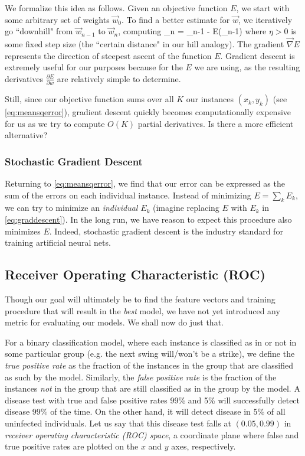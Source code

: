 \documentclass[10pt]{article}
\begin{document}
We formalize this idea as follows.
Given an objective function $E$, we start with some arbitrary set of weights $\vec{w}_0$.
To find a better estimate for $\vec{w}$, we iteratively go ``downhill" from $\vec{w}_{n-1}$ to $\vec{w}_{n}$, computing
\beq
\label{eq:graddescent}
_n = _{n-1} - \eta\vec{\nabla} E(_{n-1})
\eeq
where $\eta > 0$ is some fixed step size (the ``certain distance" in our hill analogy).
The gradient $\vec{\nabla} E$ represents the direction of steepest ascent of the function $E$.
Gradient descent is extremely useful for our purposes because for the $E$ we are using, as the resulting derivatives $\frac{\partial E}{\partial w}$ are relatively simple to determine.

Still, since our objective function sums over all $K$ our instances $(x_k, y_k)$ (see \cref{eq:meansqerror}), gradient descent quickly becomes computationally expensive for us as we try to compute $O(K)$ partial derivatives.
Is there a more efficient alternative?

\subsubsection{Stochastic Gradient Descent}

Returning to \cref{eq:meansqerror}, we find that our error can be expressed as the sum of the errors on each individual instance.
Instead of minimizing $E = \sum_k E_k$, we can try to minimize an \emph{individual} $E_k$ (imagine replacing $E$ with $E_k$ in \cref{eq:graddescent}).
In the long run, we have reason to expect this procedure also minimizes $E$.
Indeed, stochastic gradient descent is the industry standard for training artificial neural nets.

\subsection{Receiver Operating Characteristic (ROC)}

Though our goal will ultimately be to find the feature vectors and training procedure that will result in the \emph{best} model, we have not yet introduced any metric for evaluating our models.
We shall now do just that.

For a binary classification model, where each instance is classified as in or not in some particular group (e.g. the next swing will/won't be a strike), we define the \emph{true positive rate} as the fraction of the instances in the group that are classified as such by the model.
Similarly, the \emph{false positive rate} is the fraction of the instances \emph{not} in the group that are still classified as in the group by the model.
A disease test with true and false positive rates 99\% and 5\% will successfully detect disease 99\% of the time.
On the other hand, it will detect disease in 5\% of all uninfected individuals.
Let us say that this disease test falls at $(0.05, 0.99)$ in \emph{receiver operating characteristic (ROC) space}, a coordinate plane where false and true positive rates are plotted on the $x$ and $y$ axes, respectively.
\end{document}
